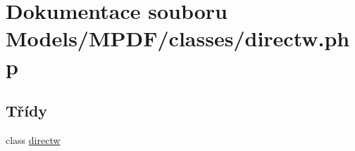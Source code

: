 \hypertarget{directw_8php}{\section{Dokumentace souboru Models/\-M\-P\-D\-F/classes/directw.php}
\label{directw_8php}
}
\subsection*{Třídy}
\begin{DoxyCompactItemize}
\item 
class \hyperlink{classdirectw}{directw}
\end{DoxyCompactItemize}
